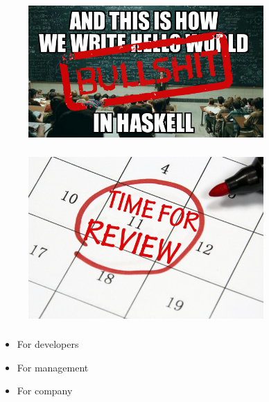 \documentclass[usenames,dvipsnames, 18pt, compress, aspectratio=169]{beamer}
\begin{document}
\begin{frame}
    \frametitle{}
    \begin{center}

    \vspace{0.5cm}
    \begin{figure}
        \includegraphics[width=0.8\textwidth,center]{haskell_no_bullshit.jpg}
    \end{figure}

    \end{center}
\end{frame}

\begin{frame}
    \frametitle{}
    \begin{center}

    \vspace{0.5cm}
    \begin{figure}
        \includegraphics[width=0.8\textwidth,center]{time_to_review.jpg}
    \end{figure}

    \end{center}
\end{frame}

\begin{frame}
    \frametitle{}
    \begin{center}
        \begin{itemize}[label={\MVRightarrow}]
            \item For developers
            \item For management
            \item For company
        \end{itemize}
    \end{center}
\end{frame}
\end{document}
